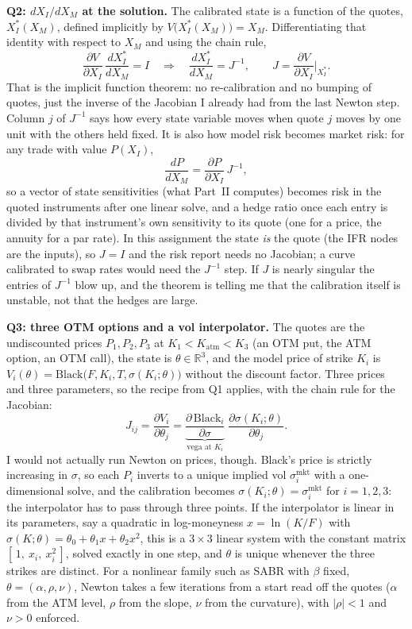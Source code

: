 \documentclass[10pt]{article}
\begin{document}
\textbf{Q2: $dX_I/dX_M$ at the solution.} The calibrated state is a function of the quotes, $X_I^*(X_M)$, defined implicitly by
$V\bigl(X_I^*(X_M)\bigr)=X_M$. Differentiating that identity with respect to $X_M$ and using the chain rule,
\[
\frac{\partial V}{\partial X_I}\,\frac{dX_I^*}{dX_M}=I \quad\Longrightarrow\quad \frac{dX_I^*}{dX_M}=J^{-1},\qquad
J=\frac{\partial V}{\partial X_I}\Big|_{X_I^*}.
\]
That is the implicit function theorem: no re-calibration and no bumping of quotes, just the inverse of the Jacobian I already had
from the last Newton step. Column $j$ of $J^{-1}$ says how every state variable moves when quote $j$ moves by one unit with the others
held fixed. It is also how model risk becomes market risk: for any trade with value $P(X_I)$,
\[
\frac{dP}{dX_M}=\frac{\partial P}{\partial X_I}\,J^{-1},
\]
so a vector of state sensitivities (what Part~II computes) becomes risk in the quoted instruments after one linear solve, and a hedge
ratio once each entry is divided by that instrument's own sensitivity to its quote (one for a price, the annuity for a par rate).
In this assignment the state \emph{is} the quote (the IFR nodes are the inputs), so $J=I$ and the risk report needs no Jacobian; a
curve calibrated to swap rates would need the $J^{-1}$ step. If $J$ is nearly singular the entries of $J^{-1}$ blow up, and the theorem
is telling me that the calibration itself is unstable, not that the hedges are large.

\textbf{Q3: three OTM options and a vol interpolator.} The quotes are the undiscounted prices $P_1,P_2,P_3$ at
$K_1<K_{\mathrm{atm}}<K_3$ (an OTM put, the ATM option, an OTM call), the state is $\theta\in\mathbb{R}^3$, and the model price of
strike $K_i$ is $V_i(\theta)=\mathrm{Black}\bigl(F,K_i,T,\sigma(K_i;\theta)\bigr)$ without the discount factor. Three prices and three
parameters, so the recipe from Q1 applies, with the chain rule for the Jacobian:
\[
J_{ij}=\frac{\partial V_i}{\partial\theta_j}=
\underbrace{\frac{\partial\,\mathrm{Black}_i}{\partial\sigma}}_{\text{vega at }K_i}\;\frac{\partial\sigma(K_i;\theta)}{\partial\theta_j}.
\]
I would not actually run Newton on prices, though. Black's price is strictly increasing in $\sigma$, so each $P_i$ inverts to a unique
implied vol $\sigma_i^{\mathrm{mkt}}$ with a one-dimensional solve, and the calibration becomes $\sigma(K_i;\theta)=\sigma_i^{\mathrm{mkt}}$
for $i=1,2,3$: the interpolator has to pass through three points. If the interpolator is linear in its parameters, say a quadratic in
log-moneyness $x=\ln(K/F)$ with $\sigma(K;\theta)=\theta_0+\theta_1x+\theta_2x^2$, this is a $3\times3$ linear system with the constant
matrix $[\,1,\ x_i,\ x_i^2\,]$, solved exactly in one step, and $\theta$ is unique whenever the three strikes are distinct. For a nonlinear
family such as SABR with $\beta$ fixed, $\theta=(\alpha,\rho,\nu)$, Newton takes a few iterations from a start read off the quotes
($\alpha$ from the ATM level, $\rho$ from the slope, $\nu$ from the curvature), with $|\rho|<1$ and $\nu>0$ enforced.
\end{document}

